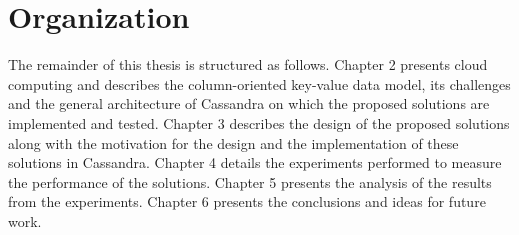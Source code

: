 \section{Organization} 

The remainder of this thesis is structured as follows.  Chapter \textmd{2} 
presents cloud computing and describes the column-oriented key-value data model, 
its challenges and the general architecture of Cassandra on which the
proposed solutions are implemented and tested. 
Chapter 3 describes the design of the proposed solutions along with the
motivation for the design and the implementation of these solutions in
Cassandra.  Chapter 4 details the experiments performed to measure the
performance of the solutions.  Chapter 5 presents the analysis of the results
from the experiments.  Chapter 6  presents the conclusions and ideas for future
work.
